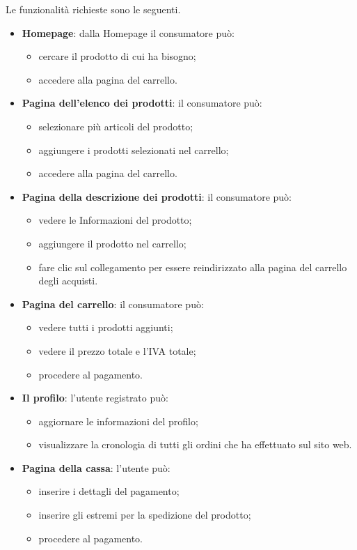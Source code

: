Le funzionalità richieste sono le seguenti.

\begin{itemize}
    \item {\textbf{Homepage}}: dalla Homepage il consumatore può:
        \begin{itemize}
            \item cercare il prodotto di cui ha bisogno;
            \item accedere alla pagina del carrello.
        \end{itemize}
    \item {\textbf{Pagina dell'elenco dei prodotti}}: il consumatore può:
        \begin{itemize}
            \item selezionare più articoli del prodotto;
            \item aggiungere i prodotti selezionati nel carrello;
            \item accedere alla pagina del carrello.
        \end{itemize}
    \item {\textbf{Pagina della descrizione dei prodotti}}: il consumatore può:
        \begin{itemize}
            \item vedere le Informazioni del prodotto;
            \item aggiungere il prodotto nel carrello;
            \item fare clic sul collegamento per essere reindirizzato alla pagina del carrello degli acquisti.
        \end{itemize}
    \item {\textbf{Pagina del carrello}}: il consumatore può:
        \begin{itemize}
            \item vedere tutti i prodotti aggiunti;
            \item vedere il prezzo totale e l'IVA totale;
            \item procedere al pagamento.
        \end{itemize}
    \item {\textbf{Il profilo}}: l'utente registrato può:
        \begin{itemize}
            \item aggiornare le informazioni del profilo;
            \item visualizzare la cronologia di tutti gli ordini che ha effettuato sul sito web.
        \end{itemize}
    \item {\textbf{Pagina della cassa}}: l'utente può:
        \begin{itemize}
            \item inserire i dettagli del pagamento;
            \item inserire gli estremi per la spedizione del prodotto;
            \item procedere al pagamento.
        \end{itemize}
\end{itemize}
